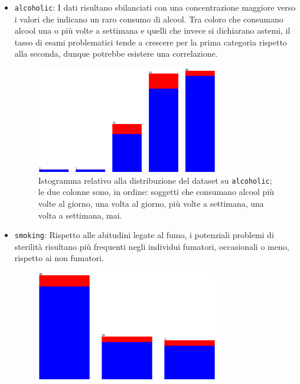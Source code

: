 \begin{itemize}
\begin{figure}[H]
{        le due colonne sono, in ordine: affetti da febbre negli ultimi tre mesi, nell'ultimo anno, mai nell'ultimo anno.
      }%
      \label{fig:fever}
    \end{figure}
  \item \texttt{alcoholic}:
    I dati risultano sbilanciati con una concentrazione maggiore verso i valori che indicano un raro consumo di alcool.
    Tra coloro che consumano alcool una o più volte a settimana e quelli che invece si dichiarano astemi, il tasso di esami problematici tende a crescere per la prima categoria rispetto alla seconda, dunque potrebbe esistere una correlazione.
    \begin{figure}[H]
      \centering
      \includegraphics[width=0.75\textwidth]{fig/alcool.eps}%
      \caption{%
        Istogramma relativo alla distribuzione del dataset su \texttt{alcoholic};
        le due colonne sono, in ordine: soggetti che consumano alcool più volte al giorno, una volta al giorno, più volte a settimana, una volta a settimana, mai.
      }%
      \label{fig:alcool}
    \end{figure}
  \item \texttt{smoking}:
    Rispetto alle abitudini legate al fumo, i potenziali problemi di sterilità risultano più frequenti negli individui fumatori, occasionali o meno, rispetto ai non fumatori.
    \begin{figure}[H]
      \centering
      \includegraphics[width=0.75\textwidth]{fig/smoke.eps}%

\end{figure}
\end{itemize}
